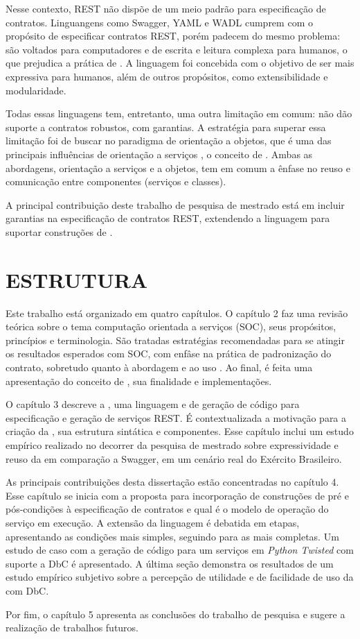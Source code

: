 Nesse contexto, REST não dispõe de um meio padrão para especificação de
contratos. Linguangens como Swagger, YAML e WADL cumprem com o propósito de
especificar contratos REST, porém padecem do mesmo problema: são voltados para
computadores e de escrita e leitura complexa para humanos, o que
prejudica a prática de \CtFirst{}. A linguagem \neoidl{} foi concebida com o objetivo de ser mais
expressiva para humanos, além de outros propósitos, como extensibilidade e
modularidade.

Todas essas linguagens tem, entretanto, uma outra limitação em comum: não dão
suporte a contratos robustos, com garantias. A estratégia para superar essa
limitação foi de buscar no paradigma de orientação a objetos, que é uma das
principais influências de orientação a serviços \cite{erl2009web},
o conceito de \designbycontract{}. Ambas as abordagens, orientação a serviços e
a objetos, tem em comum a ênfase no reuso e comunicação entre componentes
(serviços e classes).

A principal contribuição deste trabalho de
pesquisa de mestrado está em incluir garantias na especificação de
contratos REST, extendendo a linguagem \neoidl{} para suportar construções de
\designbycontract{}.



\section{ESTRUTURA}
\vspace{-6mm}

Este trabalho está organizado em quatro capítulos. O capítulo 2 faz uma revisão
teórica sobre o tema computação orientada a serviços (SOC), seus propósitos,
princípios e terminologia. São tratadas estratégias recomendadas para se
atingir os resultados esperados com SOC, com enfâse na prática de padronização
do contrato, sobretudo quanto à abordagem \CtFirst{} e ao uso \wss{}. Ao final,
é feita uma apresentação do conceito de \designbycontract{}, sua finalidade e
implementações.

O capítulo 3 descreve a \neoidl{}, uma linguagem e \framework{} de geração de
código para especificação e geração de serviços REST. É contextualizada a
motivação para a criação da \neoidl{}, sua estrutura sintática e componentes.
Esse capítulo inclui um estudo empírico realizado no decorrer da pesquisa
de mestrado sobre expressividade e reuso da \neoidl{} em comparação a Swagger,
em um cenário real do Exército Brasileiro.

As principais contribuições desta dissertação estão concentradas no capítulo 4.
Esse capítulo se inicia com a proposta para incorporação de construções de pré e
pós-condições à especificação de contratos e qual é o modelo de operação do
serviço em execução. A extensão da linguagem é debatida em etapas, apresentando
as condições mais simples, seguindo para as mais completas. Um estudo de caso
com a geração de código para um serviços em \textit{Python Twisted} com suporte
a DbC é apresentado. A última seção demonstra os resultados de um estudo
empírico subjetivo sobre a percepção de utilidade e de facilidade de uso da \neoidl{} com DbC.

Por fim, o capítulo 5 apresenta as conclusões do trabalho de pesquisa e sugere a
reali\-zação de trabalhos futuros.
